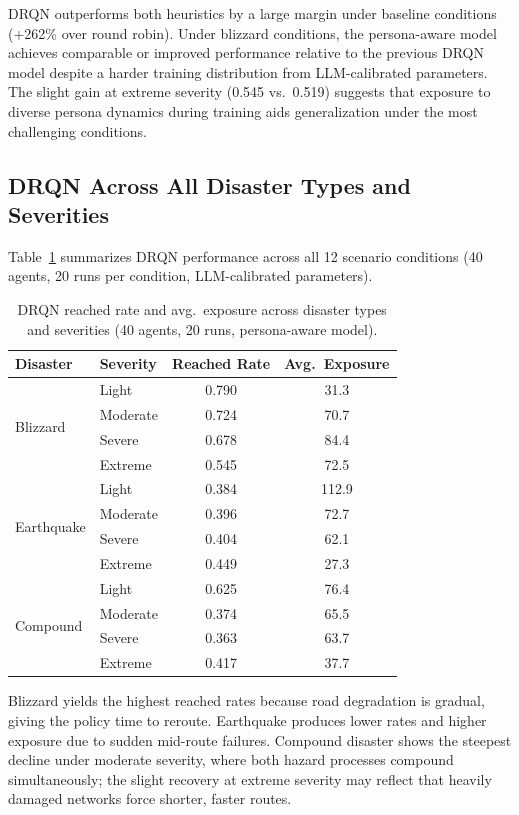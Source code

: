 \documentclass[11pt]{article}
\begin{document}
DRQN outperforms both heuristics by a large margin under baseline conditions (+262\% over round robin). Under blizzard conditions, the persona-aware model achieves comparable or improved performance relative to the previous DRQN model despite a harder training distribution from LLM-calibrated parameters. The slight gain at extreme severity (0.545 vs.\ 0.519) suggests that exposure to diverse persona dynamics during training aids generalization under the most challenging conditions.

\subsection{DRQN Across All Disaster Types and Severities}

Table~\ref{tab:sweep} summarizes DRQN performance across all 12 scenario conditions (40 agents, 20 runs per condition, LLM-calibrated parameters).

\begin{table}[h]
\centering
\caption{DRQN reached rate and avg.\ exposure across disaster types and severities (40 agents, 20 runs, persona-aware model).}
\label{tab:sweep}
\begin{tabular}{llcc}
\toprule
\textbf{Disaster} & \textbf{Severity} & \textbf{Reached Rate} & \textbf{Avg.\ Exposure} \\
\midrule
\multirow{4}{*}{Blizzard}
  & Light    & 0.790 & 31.3 \\
  & Moderate & 0.724 & 70.7 \\
  & Severe   & 0.678 & 84.4 \\
  & Extreme  & 0.545 & 72.5 \\
\midrule
\multirow{4}{*}{Earthquake}
  & Light    & 0.384 & 112.9 \\
  & Moderate & 0.396 & 72.7 \\
  & Severe   & 0.404 & 62.1 \\
  & Extreme  & 0.449 & 27.3 \\
\midrule
\multirow{4}{*}{Compound}
  & Light    & 0.625 & 76.4 \\
  & Moderate & 0.374 & 65.5 \\
  & Severe   & 0.363 & 63.7 \\
  & Extreme  & 0.417 & 37.7 \\
\bottomrule
\end{tabular}
\end{table}

Blizzard yields the highest reached rates because road degradation is gradual, giving the policy time to reroute. Earthquake produces lower rates and higher exposure due to sudden mid-route failures. Compound disaster shows the steepest decline under moderate severity, where both hazard processes compound simultaneously; the slight recovery at extreme severity may reflect that heavily damaged networks force shorter, faster routes.
\end{document}
